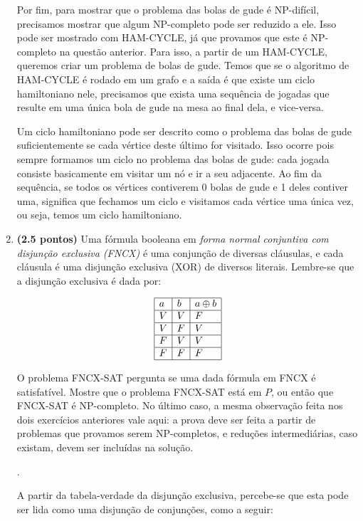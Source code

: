 \documentclass[12pt]{article}
\newcommand{\resposta}[1]{ \noindent {\bf Solução}. {\color{blue} #1}}
\begin{document}
\begin{enumerate}
{    Por fim, para mostrar que o problema das bolas de gude é NP-difícil, precisamos mostrar que algum NP-completo pode ser reduzido a ele. Isso pode ser mostrado com HAM-CYCLE, já que provamos que este é NP-completo na questão anterior. Para isso, a partir de um HAM-CYCLE, queremos criar um problema de bolas de gude. Temos que se o algoritmo de HAM-CYCLE é rodado em um grafo e a saída é que existe um ciclo hamiltoniano nele, precisamos que exista uma sequência de jogadas que resulte em uma única bola de gude na mesa ao final dela, e vice-versa.
    
    Um ciclo hamiltoniano pode ser descrito como o problema das bolas de gude suficientemente se cada vértice deste último for visitado. Isso ocorre pois sempre formamos um ciclo no problema das bolas de gude: cada jogada consiste basicamente em visitar um nó e ir a seu adjacente. Ao fim da sequência, se todos os vértices contiverem 0 bolas de gude e 1 deles contiver uma, significa que fechamos um ciclo e visitamos cada vértice uma única vez, ou seja, temos um ciclo hamiltoniano.
    
  }
  
\item {\bf (2.5 pontos)} Uma fórmula booleana em {\it forma normal conjuntiva com disjunção exclusiva (FNCX)} é uma conjunção de diversas cláusulas, e cada cláusula é uma disjunção exclusiva (XOR) de diversos literais. Lembre-se que a disjunção exclusiva é dada por:

  $$\begin{array}{|l|l|l|}\hline
      a & b & a \oplus b \\ \hline
      V & V & F \\ \hline
      V & F & V \\ \hline
      F & V & V \\ \hline
      F & F & F \\ \hline
  \end{array}$$

  O problema FNCX-SAT pergunta se uma dada fórmula em FNCX é
  satisfatível. Mostre que o problema FNCX-SAT está em $P$, ou então
  que FNCX-SAT é NP-completo. No último caso, a mesma observação feita
  nos dois exercícios anteriores vale aqui: a prova deve ser feita a
  partir de problemas que provamos serem NP-completos, e reduções
  intermediárias, caso existam, devem ser incluídas na solução.

  \resposta{
    A partir da tabela-verdade da disjunção exclusiva, percebe-se que esta pode ser lida como uma disjunção de conjunções, como a seguir:
    
}
\end{enumerate}
\end{document}
